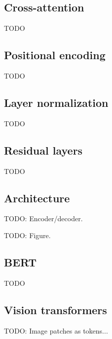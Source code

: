 \subsection{Cross-attention}

TODO

\subsection{Positional encoding}

TODO

\subsection{Layer normalization}

TODO

\subsection{Residual layers}

TODO

\subsection{Architecture}

TODO: Encoder/decoder.

TODO: Figure.

\subsection{BERT}

TODO

\subsection{Vision transformers}

TODO: Image patches as tokens...
